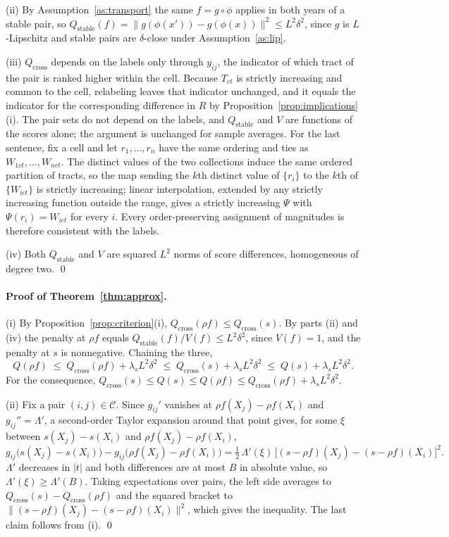 \documentclass[11pt]{article}
\theoremstyle{remark}
\newcommand{\Qc}{Q_{\mathrm{cross}}}
\newcommand{\Qs}{Q_{\mathrm{stable}}}
\newcommand{\Qt}{Q}
\newcommand{\Cc}{\mathcal{C}}
\begin{document}
(ii) By Assumption~\ref{as:transport} the same $f = g\circ\phi$ applies in both years of a stable pair,
so $\Qs(f) = \|g(\phi(x')) - g(\phi(x))\|^{2} \le L^{2}\delta^{2}$, since $g$ is $L$-Lipschitz and
stable pairs are $\delta$-close under Assumption~\ref{as:lip}.

(iii) $\Qc$ depends on the labels only through $y_{ij}$, the indicator of which tract of the pair is
ranked higher within the cell. Because $T_{ct}$ is strictly increasing and common to the cell,
relabeling leaves that indicator unchanged, and it equals the indicator for the corresponding
difference in $R$ by Proposition~\ref{prop:implications}(i). The pair sets do not depend on the labels,
and $\Qs$ and $V$ are functions of the scores alone; the argument is unchanged for sample averages. For
the last sentence, fix a cell and let $r_1,\dots,r_n$ have the same ordering and ties as
$W_{1ct},\dots,W_{nct}$. The distinct values of the two collections induce the same ordered partition of
tracts, so the map sending the $k$th distinct value of $\{r_i\}$ to the $k$th of $\{W_{ict}\}$ is
strictly increasing; linear interpolation, extended by any strictly increasing function outside the
range, gives a strictly increasing $\Psi$ with $\Psi(r_i)=W_{ict}$ for every $i$. Every
order-preserving assignment of magnitudes is therefore consistent with the labels.

(iv) Both $\Qs$ and $V$ are squared $L^{2}$ norms of score differences, homogeneous of degree two. \qed

\paragraph{Proof of Theorem~\ref{thm:approx}.} (i) By Proposition~\ref{prop:criterion}(i),
$\Qc(\rho f) \le \Qc(s)$. By parts (ii) and (iv) the penalty at $\rho f$ equals
$\Qs(f)/V(f) \le L^{2}\delta^{2}$, since $V(f) = 1$, and the penalty at $s$ is nonnegative. Chaining
the three,
\[
    \Qt(\rho f) \;\le\; \Qc(\rho f) + \lambda_{s}L^{2}\delta^{2}
    \;\le\; \Qc(s) + \lambda_{s}L^{2}\delta^{2}
    \;\le\; \Qt(s) + \lambda_{s}L^{2}\delta^{2}.
\]
For the consequence, $\Qc(s) \le \Qt(s) \le \Qt(\rho f) \le \Qc(\rho f) + \lambda_{s}L^{2}\delta^{2}$.

(ii) Fix a pair $(i,j)\in\Cc$. Since $g_{ij}'$ vanishes at $\rho f(X_j)-\rho f(X_i)$ and
$g_{ij}'' = \Lambda'$, a second-order Taylor expansion around that point gives, for some $\xi$ between
$s(X_j)-s(X_i)$ and $\rho f(X_j)-\rho f(X_i)$,
\[
    g_{ij}\big(s(X_j)-s(X_i)\big) - g_{ij}\big(\rho f(X_j)-\rho f(X_i)\big)
    = \tfrac12\,\Lambda'(\xi)\,\Big[(s-\rho f)(X_j) - (s-\rho f)(X_i)\Big]^{2}.
\]
$\Lambda'$ decreases in $|t|$ and both differences are at most $B$ in absolute value, so
$\Lambda'(\xi) \ge \Lambda'(B)$. Taking expectations over pairs, the left side averages to
$\Qc(s)-\Qc(\rho f)$ and the squared bracket to $\|(s-\rho f)(X_j)-(s-\rho f)(X_i)\|^{2}$, which gives the
inequality. The last claim follows from (i). \qed
\end{document}
